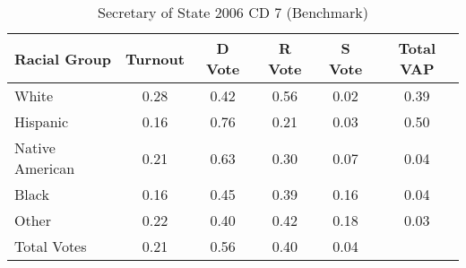 \begin{table}[htb]
\begin{center}
\caption{Secretary of State 2006 CD 7 (Benchmark)}
\label{sos06_vap_cd_7_benchmark}
\begin{tabular}{lccccc}
  \hline
Racial Group & Turnout & D Vote & R Vote & S Vote & Total VAP \\ 
  \hline
White & 0.28 & 0.42 & 0.56 & 0.02 & 0.39 \\ 
  Hispanic & 0.16 & 0.76 & 0.21 & 0.03 & 0.50 \\ 
  Native American & 0.21 & 0.63 & 0.30 & 0.07 & 0.04 \\ 
  Black & 0.16 & 0.45 & 0.39 & 0.16 & 0.04 \\ 
  Other & 0.22 & 0.40 & 0.42 & 0.18 & 0.03 \\ 
  Total Votes & 0.21 & 0.56 & 0.40 & 0.04 &  \\ 
   \hline
\end{tabular}
\end{center}
\end{table}
